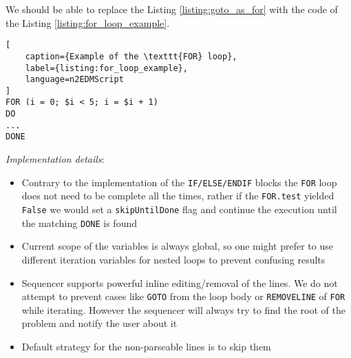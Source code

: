 We should be able to replace the Listing \ref{listing:goto_as_for} with the code of the Listing \ref{listing:for_loop_example}.
\begin{lstlisting}[
	caption={Example of the \texttt{FOR} loop}, 
	label={listing:for_loop_example},
	language=n2EDMScript
]
FOR (i = 0; $i < 5; i = $i + 1)
DO
...
DONE
\end{lstlisting}

\textit{Implementation details}: 

\begin{itemize}
	\item Contrary to the implementation of the \texttt{IF/ELSE/ENDIF} blocks the \texttt{FOR} loop does not need to be complete all the times, rather if the \texttt{FOR.test} yielded \texttt{False} we would set a \texttt{skipUntilDone} flag and continue the execution until the matching \texttt{DONE} is found
	\item Current scope of the variables is always global, so one might prefer to use different iteration variables for nested loops to prevent confusing results
	\item Sequencer supports powerful inline editing/removal of the lines. We do not attempt to prevent cases like \texttt{GOTO} from the loop body or \texttt{REMOVELINE} of \texttt{FOR} while iterating. However the sequencer will always try to find the root of the problem and notify the user about it
	\item Default strategy for the non-parseable lines is to skip them
\end{itemize}

%
%
%
%
%
%
%
